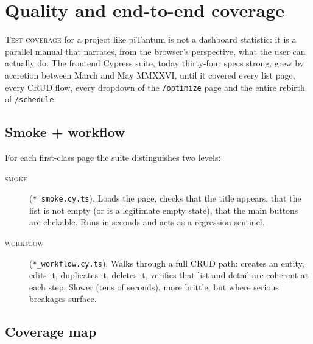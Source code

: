 \chapter{Quality and end-to-end coverage}
\label{ch:qualita-e2e-en}

\lettrine[lines=3]{T}{est coverage} for a project like piTantum
is not a dashboard statistic: it is a parallel manual that
narrates, from the browser's perspective, what the user can
actually do. The frontend Cypress suite, today thirty-four specs
strong, grew by accretion between March and May MMXXVI, until it
covered every list page, every CRUD flow, every dropdown of the
\texttt{/optimize} page and the entire rebirth of
\texttt{/schedule}.

\section{Smoke + workflow}

For each first-class page the suite distinguishes two levels:

\begin{description}
  \item[\textsc{smoke}] (\texttt{*\_smoke.cy.ts}). Loads the
    page, checks that the title appears, that the list is not
    empty (or is a legitimate empty state), that the main
    buttons are clickable. Runs in seconds and acts as a
    regression sentinel.
  \item[\textsc{workflow}] (\texttt{*\_workflow.cy.ts}). Walks
    through a full CRUD path: creates an entity, edits it,
    duplicates it, deletes it, verifies that list and detail
    are coherent at each step. Slower (tens of seconds), more
    brittle, but where serious breakages surface.
\end{description}

\section{Coverage map}

